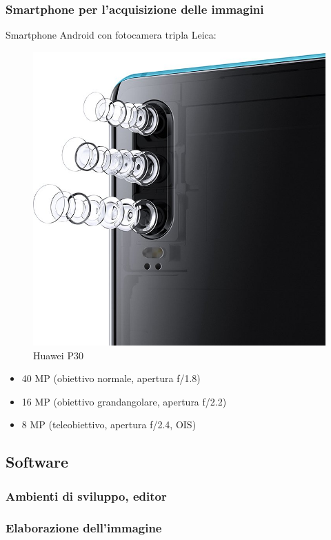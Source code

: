 \documentclass[twoside]{supsistudent}
\begin{document}
\subsubsection{Smartphone per l'acquisizione delle immagini}
Smartphone Android con fotocamera tripla Leica:
\begin{figure}[H]
  \center
  \includegraphics[scale=0.15]{images/smartphone.jpg}
  \caption{Huawei P30}
\end{figure}
\begin{itemize}
  \item 40 MP (obiettivo normale, apertura f/1.8)
  \item 16 MP (obiettivo grandangolare, apertura f/2.2)
  \item 8 MP (teleobiettivo, apertura f/2.4, OIS)
\end{itemize}
\subsection{Software}
\subsubsection{Ambienti di sviluppo, editor}

\subsubsection{Elaborazione dell'immagine}
\end{document}
